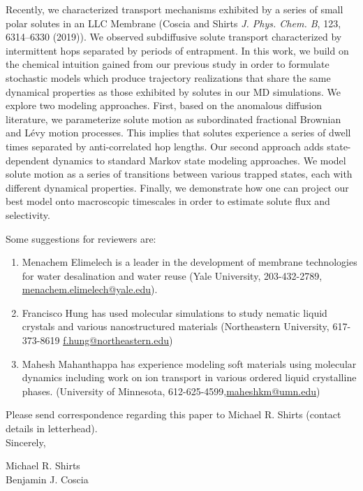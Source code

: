 \documentclass[fontsize=11pt]{article}
\begin{document}
	Recently, we characterized transport mechanisms exhibited by a series of 
	small polar solutes in an LLC Membrane (Coscia and Shirts \textit{J. Phys.
	Chem. B}, 123, 6314--6330 (2019)). We observed subdiffusive solute transport
	characterized by intermittent hops separated by periods of entrapment. In
	this work, we build on the chemical intuition gained from our previous study
	in order to formulate stochastic models which produce trajectory realizations
	that share the same dynamical properties as those exhibited by solutes in 
	our MD simulations. We explore two modeling approaches. First, based on the
	anomalous diffusion literature, we parameterize solute motion as 
    subordinated fractional Brownian and L\'evy motion processes. This implies that 
	solutes experience a series of dwell times separated by anti-correlated hop
	lengths. Our second approach adds state-dependent dynamics to standard Markov
	state modeling approaches. We model solute motion as a series of transitions
	between various trapped states, each with different dynamical properties.
	Finally, we demonstrate how one can project our best model onto macroscopic 
	timescales in order to estimate solute flux and selectivity.
	
	\noindent Some suggestions for reviewers are:
	\begin{enumerate}

		\item Menachem Elimelech is a leader in the development of membrane technologies
		for	water desalination and water reuse (Yale University, 203-432-2789,
		\href{mailto:menachem.elimelech@yale.edu}{menachem.elimelech@yale.edu}).
	
		\item Francisco Hung has used molecular simulations to study nematic liquid crystals
		and various	nanostructured materials (Northeastern University, 617-373-8619 	
		\href{mailto:f.hung@northeastern.edu}{f.hung@northeastern.edu})
		
		\item Mahesh Mahanthappa has experience modeling soft materials using molecular dynamics
		including work on ion transport in various ordered liquid crystalline phases. 
		(University of Minnesota, 612-625-4599,\href{mailto:maheshkm@umn.edu}{maheshkm@umn.edu})
		
	\end{enumerate}
	
	\noindent Please send correspondence regarding this paper to Michael R. Shirts (contact
	details in letterhead).\\	
	
	\noindent Sincerely,
	
	\noindent Michael R. Shirts \\
	\noindent Benjamin J. Coscia \\
	
\end{document}
